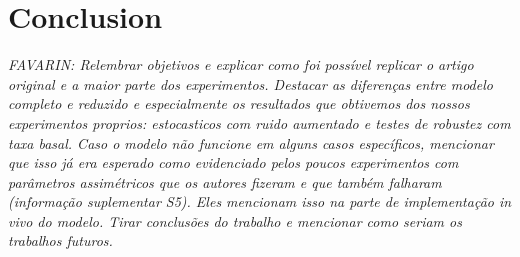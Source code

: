 \section{Conclusion}

  \textit{FAVARIN: Relembrar objetivos e explicar como foi possível replicar o artigo original e a maior parte dos experimentos.
  Destacar as diferenças entre modelo completo e reduzido e especialmente os resultados que obtivemos dos nossos experimentos proprios: estocasticos com ruido aumentado e testes de robustez com taxa basal.
  Caso o modelo não funcione em alguns casos específicos, mencionar que isso já era esperado como evidenciado pelos poucos experimentos com parâmetros assimétricos que os autores fizeram e que também falharam (informação suplementar S5).
  Eles mencionam isso na parte de implementação in vivo do modelo.
  Tirar conclusões do trabalho e mencionar como seriam os trabalhos futuros.}

